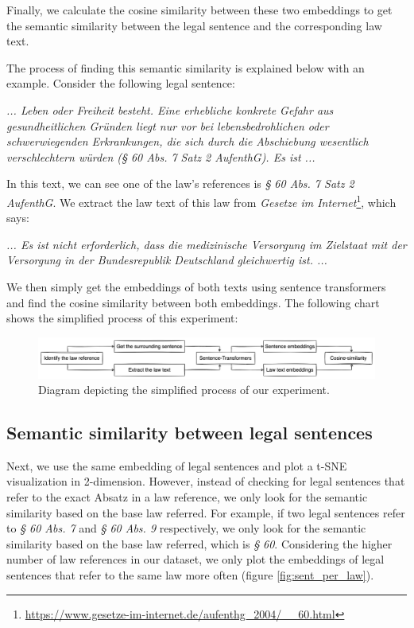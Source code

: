 \documentclass[runningheads]{llncs}
\begin{document}
Finally, we calculate the cosine similarity between these two embeddings to get the semantic similarity between the legal sentence and the corresponding law text.

The process of finding this semantic similarity is explained below with an example. Consider the following legal sentence:\\

\begin{mdframed}
\textit{... Leben oder Freiheit besteht. Eine erhebliche konkrete Gefahr aus gesundheitlichen Gründen liegt nur vor bei lebensbedrohlichen oder schwerwiegenden Erkrankungen, die sich durch die Abschiebung wesentlich verschlechtern würden (§ 60 Abs. 7 Satz 2 AufenthG). Es ist ...}
\end{mdframed}

In this text, we can see one of the law's references is \textit{§ 60 Abs. 7 Satz 2 AufenthG}. We extract the law text of this law from \textit{Gesetze im Internet}\footnote{\url{https://www.gesetze-im-internet.de/aufenthg_2004/__60.html}}, which says:

\begin{mdframed}
\textit{... Es ist nicht erforderlich, dass die medizinische Versorgung im Zielstaat mit der Versorgung in der Bundesrepublik Deutschland gleichwertig ist. ...}
\end{mdframed}

We then simply get the embeddings of both texts using sentence transformers and find the cosine similarity between both embeddings. The following chart shows the simplified process of this experiment:

\begin{figure}[h]
	\centering
	\includegraphics[width=1.0\linewidth]{images/paper_experiment.png}
	\caption{Diagram depicting the simplified process of our experiment.}
	\label{fig:experiment}
\end{figure}

\subsection{Semantic similarity between legal sentences}
Next, we use the same embedding of legal sentences and plot a t-SNE visualization in 2-dimension. However, instead of checking for legal sentences that refer to the exact Absatz in a law reference, we only look for the semantic similarity based on the base law referred. For example, if two legal sentences refer to \textit{§ 60 Abs. 7} and \textit{§ 60 Abs. 9} respectively, we only look for the semantic similarity based on the base law referred, which is \textit{§ 60}. Considering the higher number of law references in our dataset, we only plot the embeddings of legal sentences that refer to the same law more often (figure \ref{fig:sent_per_law}).
\end{document}
